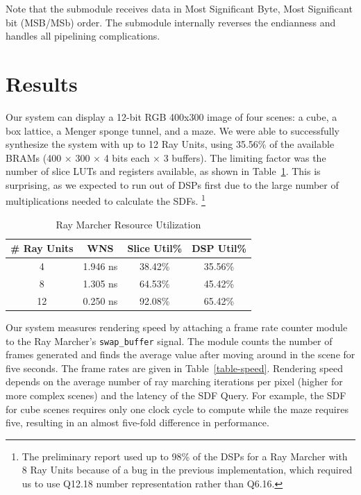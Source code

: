 \documentclass[conference]{IEEEtran}
\begin{document}
Note that the submodule receives data in Most Significant Byte, Most Significant bit (MSB/MSb) order. The submodule internally reverses the endianness and handles all pipelining complications.


\section{Results}

Our system can display a 12-bit RGB 400x300 image of four scenes: a cube, a box lattice, a Menger sponge tunnel, and a maze. We were able to successfully synthesize the system with up to 12 Ray Units, using 35.56\% of the available BRAMs (400 $\times$ 300 $\times$ 4 bits each $\times$ 3 buffers). The limiting factor was the number of slice LUTs and registers available, as shown in Table~\ref{table-resource}. This is surprising, as we expected to run out of DSPs first due to the large number of multiplications needed to calculate the SDFs. \footnote{The preliminary report used up to 98\% of the DSPs for a Ray Marcher with 8 Ray Units because of a bug in the previous implementation, which required us to use Q12.18 number representation rather than Q6.16.}


\begin{table}[!t]
\renewcommand{\arraystretch}{1.3}
\caption{Ray Marcher Resource Utilization}
\label{table-resource}
\centering
\begin{tabular}{c||c|c|c}
\hline
\bfseries \# Ray Units & \bfseries WNS & \bfseries Slice Util\% & \bfseries DSP Util\% \\
\hline\hline
4 & 1.946 ns & 38.42\% & 35.56\% \\
8 & 1.305 ns & 64.53\% & 45.42\% \\
12 & 0.250 ns & 92.08\% & 65.42\% \\
\hline
\end{tabular}
\end{table}

Our system measures rendering speed by attaching a frame rate counter module to the Ray Marcher's \texttt{swap\_buffer} signal. The module counts the number of frames generated and finds the average value after moving around in the scene for five seconds. The frame rates are given in Table~\ref{table-speed}. Rendering speed depends on the average number of ray marching iterations per pixel (higher for more complex scenes) and the latency of the SDF Query. For example, the SDF for cube scenes requires only one clock cycle to compute while the maze requires five, resulting in an almost five-fold difference in performance.
\end{document}
